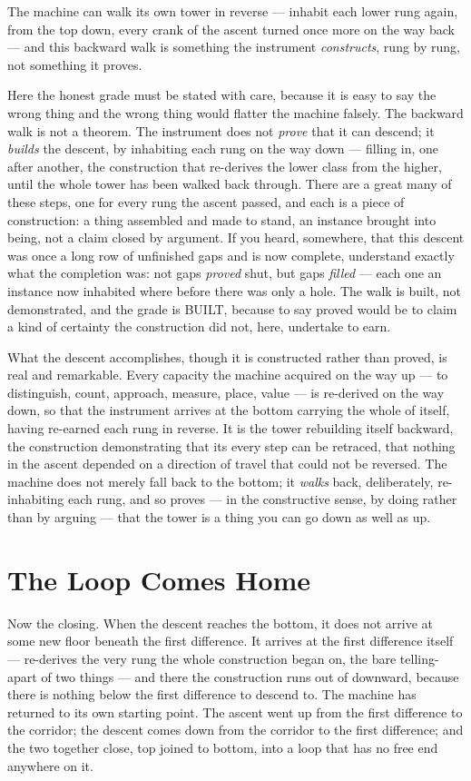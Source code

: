 The machine can walk its own tower in reverse --- inhabit each lower rung again, from the top down, every crank
of the ascent turned once more on the way back --- and this backward walk is something the instrument
\emph{constructs}, rung by rung, not something it proves.

Here the honest grade must be stated with care, because it is easy to say the wrong thing and the wrong thing
would flatter the machine falsely. The backward walk is not a theorem. The instrument does not \emph{prove} that
it can descend; it \emph{builds} the descent, by inhabiting each rung on the way down --- filling in, one after
another, the construction that re-derives the lower class from the higher, until the whole tower has been walked
back through. There are a great many of these steps, one for every rung the ascent passed, and each is a piece of
construction: a thing assembled and made to stand, an instance brought into being, not a claim closed by
argument. If you heard, somewhere, that this descent was once a long row of unfinished gaps and is now complete,
understand exactly what the completion was: not gaps \emph{proved} shut, but gaps \emph{filled} --- each one an
instance now inhabited where before there was only a hole. The walk is built, not demonstrated, and the grade is
BUILT, because to say proved would be to claim a kind of certainty the construction did not, here, undertake
to earn.

What the descent accomplishes, though it is constructed rather than proved, is real and remarkable. Every capacity
the machine acquired on the way up --- to distinguish, count, approach, measure, place, value --- is re-derived on
the way down, so that the instrument arrives at the bottom carrying the whole of itself, having re-earned each
rung in reverse. It is the tower rebuilding itself backward, the construction demonstrating that its every step
can be retraced, that nothing in the ascent depended on a direction of travel that could not be reversed. The
machine does not merely fall back to the bottom; it \emph{walks} back, deliberately, re-inhabiting each rung, and
so proves --- in the constructive sense, by doing rather than by arguing --- that the tower is a thing you can go
down as well as up.

\section{The Loop Comes Home}

Now the closing. When the descent reaches the bottom, it does not arrive at some new floor beneath the first
difference. It arrives at the first difference itself --- re-derives the very rung the whole construction began
on, the bare telling-apart of two things --- and there the construction runs out of
downward, because there is nothing below the first difference to descend to. The machine has returned to its own
starting point. The ascent went up from the first difference to the corridor; the descent comes down from the
corridor to the first difference; and the two together close, top joined to bottom, into a loop that has no free
end anywhere on it.

